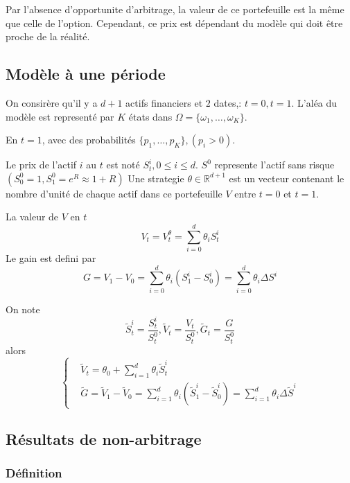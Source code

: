 \documentclass{article}
\theoremstyle{plain}
\theoremstyle{definition}
\begin{document}
Par l'absence d'opportunite d'arbitrage, la valeur de ce portefeuille est la m\^{e}me que celle de l'option. Cependant, ce prix est d\'ependant du mod\`ele qui doit \^etre proche de la r\'ealit\'e.

\subsection{Mod\`ele \`a une p\'eriode}

On consir\`ere qu'il y a $d+1$ actifs financiers et $2$ dates,: $t=0, t=1$. L'al\'ea du mod\`ele est represent\'e par $K$ \'etats dans $\Omega=\{\omega_1,\ldots,\omega_K\}$.

En $t=1$, avec des probabilit\'es $ \{p_1,\ldots,p_K\},(p_i>0) $.

Le prix de l'actif $i$ au $t$ est not\'e $S_t^i, 0\leq i\leq d$. $S^0$ represente l'actif sans risque $(S_0^0=1, S_1^0=e^R\approx 1+R)$
Une strategie $\theta\in\mathbb{R}^{d+1}$ est un vecteur contenant le nombre d'unit\'e de chaque actif dans ce portefeuille $V$ entre $t=0$ et $t=1$. 

La valeur de $V$ en $t$
\begin{equation}
V_t=V_t^\theta=\sum_{i=0}^d\theta_i S_t^i
\end{equation}
Le gain est defini par 
\begin{equation}
G=V_1-V_0=\sum_{i=0}^d \theta_i (S_1^i-S_0^i)=\sum_{i=0}^d \theta_i \Delta S^i
\end{equation}

On note
\begin{equation}
	\tilde{S}_t^i=\frac{S_t^i}{S_t^0},\tilde{V}_t=\frac{V_t}{S_t^0},\tilde{G}_t=\frac{G}{S_t^0}
\end{equation}
alors
\begin{equation}
\left \{ \begin{array}{ll}
&\tilde{V}_t =\theta_0+\sum_{i=1}^{d}\theta_i \tilde{S}_t^i\\
&\tilde{G} =\tilde{V}_1-\tilde{V}_0=\sum_{i=1}^d \theta_i (\tilde{S}_1^i-\tilde{S}_0^i)=\sum_{i=1}^d\theta_i\Delta \tilde{S}^i
\end{array}\right.
\end{equation}

\subsection{R\'esultats de non-arbitrage}
\subsubsection{D\'efinition}
\end{document}
